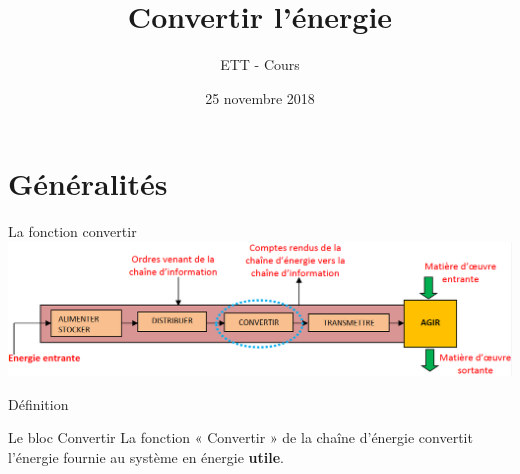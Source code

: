 \documentclass{beamer}
\title{Convertir l'énergie}
\subtitle{}
\author{ETT - Cours}
\institute{Lycée Louis Armand}
\date{25 novembre 2018}
\begin{document}
\begin{frame}{}

\end{frame}
    \begin{frame}
        \maketitle
    \end{frame}

    \begin{frame}
        \tableofcontents
    \end{frame}

    \section{Généralités}
    \begin{frame}{La fonction convertir}
      \centering
      \includegraphics[width=\textwidth]{images/S03_C03}
    \end{frame}


    \begin{frame}{Définition}
      \begin{alertblock}{Le bloc Convertir}
        La fonction « Convertir » de la chaîne d'énergie convertit l'énergie fournie au système en énergie \textbf{utile}.
      \end{alertblock}

    \end{frame}
\end{document}
